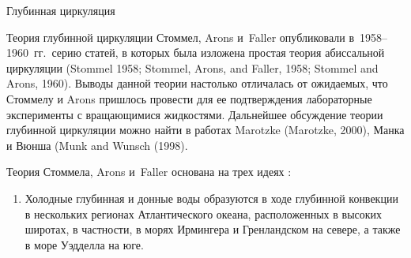 \begin{chapter}{Глубинная циркуляция}
\begin{section}{Теория глубинной циркуляции}
%
%
Стоммел, Arons и~Faller опубликовали в~1958--1960~гг.\ серию статей, в которых
была изложена простая теория абиссальной циркуляции%
%
(Stommel 1958; Stommel, Arons, and Faller, 1958; Stommel and Arons, 1960). 
Выводы данной теории настолько отличалась от ожидаемых, что Стоммелу 
и Arons пришлось провести для ее подтверждения лабораторные эксперименты
с вращающимися жидкостями. Дальнейшее обсуждение теории глубинной циркуляции
можно найти в работах Marotzke (Marotzke, 2000), 
Манка и Вюнша (Munk and Wunsch (1998).
%

Теория Стоммела, Arons и~Faller
основана на трех идеях%
%
:
%
%
\begin{enumerate}
\item
Холодные глубинная и донные воды образуются в ходе глубинной конвекции в нескольких
регионах Атлантического океана, расположенных в высоких широтах, в частности,
в морях Ирмингера и Гренландском на севере, а также в море Уэдделла на юге. 
%


\end{enumerate}
\end{section}
\end{chapter}
